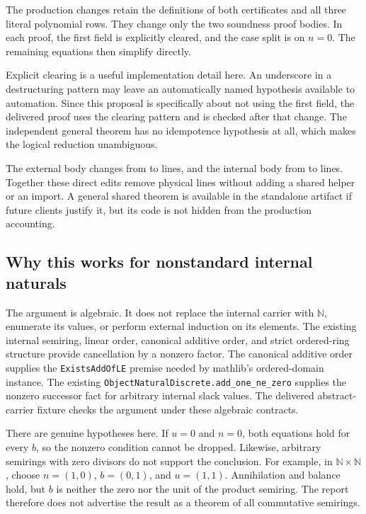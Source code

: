 \documentclass[11pt]{article}
\newcommand{\N}{\mathbb N}
\newcommand{\code}[1]{\nolinkurl{#1}}
\begin{document}
The production changes retain the definitions of both certificates and all
three literal polynomial rows. They change only the two soundness proof
bodies. In each proof, the first field is explicitly cleared, and the case
split is on $n=0$. The remaining equations then simplify directly.

Explicit clearing is a useful implementation detail here. An underscore in a
destructuring pattern may leave an automatically named hypothesis available to
automation. Since this proposal is specifically about not using the first
field, the delivered proof uses the clearing pattern and is checked after that
change. The independent general theorem has no idempotence hypothesis at all,
which makes the logical reduction unambiguous.

The external body changes from \ZeroExternalOldBody{} to
\ZeroExternalNewBody{} lines, and the internal body from
\ZeroInternalOldBody{} to \ZeroInternalNewBody{} lines. Together these direct
edits remove \ZeroSaved{} physical lines without adding a shared helper or an
import. A general shared theorem is available in the standalone artifact if
future clients justify it, but its code is not hidden from the production
accounting.

\subsection{Why this works for nonstandard internal naturals}

The argument is algebraic. It does not replace the internal carrier with
$\N$, enumerate its values, or perform external induction on its elements.
The existing internal semiring, linear order, canonical additive order, and
strict ordered-ring structure provide cancellation by a nonzero factor.
The canonical additive order supplies the \code{ExistsAddOfLE} premise needed
by mathlib's ordered-domain instance. The existing
\code{ObjectNaturalDiscrete.add_one_ne_zero} supplies the nonzero successor
fact for arbitrary internal slack values. The delivered abstract-carrier
fixture checks the argument under these algebraic contracts.

There are genuine hypotheses here. If $u=0$ and $n=0$, both equations hold for
every $b$, so the nonzero condition cannot be dropped. Likewise, arbitrary
semirings with zero divisors do not support the conclusion. For example, in
$\N\times\N$, choose $n=(1,0)$, $b=(0,1)$, and $u=(1,1)$. Annihilation and
balance hold, but $b$ is neither the zero nor the unit of the product semiring.
The report therefore does not advertise the result as a theorem of all
commutative semirings.
\end{document}
